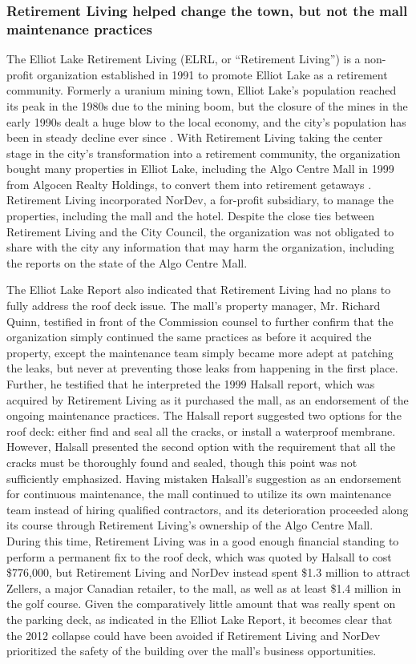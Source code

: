 \documentclass[12pt]{article}
\begin{document}
\subsubsection{Retirement Living helped change the town, but not the mall maintenance practices}

The Elliot Lake Retirement Living (ELRL, or ``Retirement Living'') is a non-profit organization established in 1991 to promote Elliot Lake as a retirement community. Formerly a uranium mining town, Elliot Lake's population reached its peak in the 1980s due to the mining boom, but the closure of the mines in the early 1990s dealt a huge blow to the local economy, and the city's population has been in steady decline ever since \cite{ElliotLakePopulation}. With Retirement Living taking the center stage in the city's transformation into a retirement community, the organization bought many properties in Elliot Lake, including the Algo Centre Mall in 1999 from Algocen Realty Holdings, to convert them into retirement getaways \cite{NYT1996}. Retirement Living incorporated NorDev, a for-profit subsidiary, to manage the properties, including the mall and the hotel. Despite the close ties between Retirement Living and the City Council, the organization was not obligated to share with the city any information that may harm the organization, including the reports on the state of the Algo Centre Mall. 

The Elliot Lake Report also indicated that Retirement Living had no plans to fully address the roof deck issue. The mall's property manager, Mr. Richard Quinn, testified in front of the Commission counsel to further confirm that the organization simply continued the same practices as before it acquired the property, except the maintenance team simply became more adept at patching the leaks, but never at preventing those leaks from happening in the first place. Further, he testified that he interpreted the 1999 Halsall report, which was acquired by Retirement Living as it purchased the mall, as an endorsement of the ongoing maintenance practices. The Halsall report suggested two options for the roof deck: either find and seal all the cracks, or install a waterproof membrane. However, Halsall presented the second option with the requirement that all the cracks must be thoroughly found and sealed, though this point was not sufficiently emphasized. Having mistaken Halsall's suggestion as an endorsement for continuous maintenance, the mall continued to utilize its own maintenance team instead of hiring qualified contractors, and its deterioration proceeded along its course through Retirement Living's ownership of the Algo Centre Mall. During this time, Retirement Living was in a good enough financial standing to perform a permanent fix to the roof deck, which was quoted by Halsall to cost \$776,000, but Retirement Living and NorDev instead spent \$1.3 million to attract Zellers, a major Canadian retailer, to the mall, as well as at least \$1.4 million in the golf course. Given the comparatively little amount that was really spent on the parking deck, as indicated in the Elliot Lake Report, it becomes clear that the 2012 collapse could have been avoided if Retirement Living and NorDev prioritized the safety of the building over the mall's business opportunities.
\end{document}
